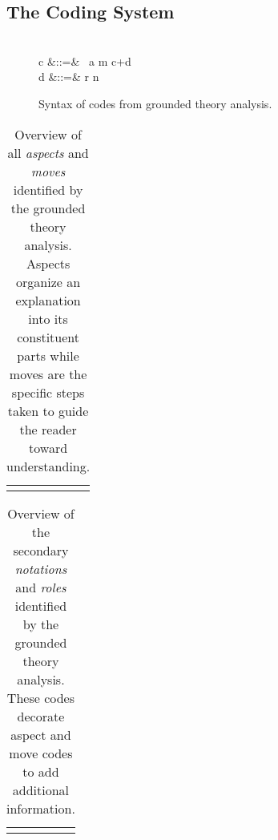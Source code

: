 \documentclass[sigconf]{acmart}
\begin{document}
\subsection{The Coding System}
\label{sec:res:sys}

\newcommand{\OR}{\OB{\hspace{1.5ex}|\hspace{1.5ex}}}

\newcommand{\Push}{\OB{\Rightarrow}}
\newcommand{\Pop}{\OB{\Leftarrow}}
\newcommand{\PopPush}{\OB{\Leftrightarrow}}

\begin{figure}
\begin{syntax}
 \\
c\in{}
 &::=& \Push~a
 \OR \!\Pop\!
 \OR m
 \OR c+d \\
d\in{}
 &::=& r \OR n
\end{syntax}

\vspace{-1.5ex}
\caption{Syntax of codes from grounded theory analysis.}
\label{tbl:codes:syntax}
\end{figure}

\begin{table}
\begin{tabular}{ll}

\\[-1.5ex]

\\[-1.5ex]
\end{tabular}
\caption{Overview of all \emph{aspects} and \emph{moves} identified by the grounded theory
analysis. Aspects organize an explanation into its constituent parts while
moves are the specific steps taken to guide the reader toward understanding.}
\label{tbl:codes:main}
\end{table}


\begin{table}
\begin{tabular}{ll}

\\[-1.5ex]

\\[-1.5ex]
\end{tabular}
\caption{Overview of the secondary \emph{notations} and \emph{roles} identified
by the grounded theory analysis. These codes decorate aspect and move codes to
add additional information.}
\label{tbl:codes:dec}
\end{table}
\end{document}

